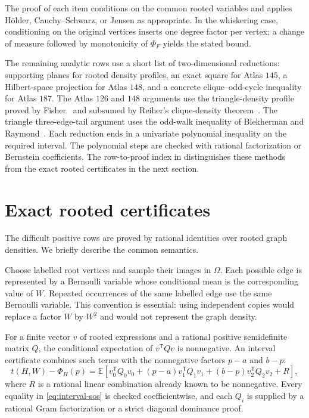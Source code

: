 \documentclass[11pt]{article}
\numberwithin{equation}{section}
\theoremstyle{definition}
\theoremstyle{remark}
\begin{document}
The proof of each item conditions on the common rooted variables and applies
H\"older, Cauchy--Schwarz, or Jensen as appropriate.  In the whiskering
case, conditioning on the original vertices inserts one degree factor per
vertex; a change of measure followed by monotonicity of $\Phi_F$ yields the
stated bound.

The remaining analytic rows use a short list of two-dimensional reductions:
supporting planes for rooted density profiles, an exact square for Atlas
$145$, a Hilbert-space projection for Atlas $148$, and a concrete
clique--odd-cycle inequality for Atlas $187$.  The Atlas $126$ and $148$
arguments use the triangle-density profile proved by Fisher~\cite{Fisher1989}
and subsumed by Reiher's clique-density theorem~\cite{Reiher2016}.  The
triangle three-edge-tail argument uses the odd-walk inequality of Blekherman
and Raymond~\cite{BlekhermanRaymond2023}.  Each reduction ends in a
univariate polynomial inequality on the required interval.  The polynomial
steps are checked with rational factorization or Bernstein coefficients.
The row-to-proof index in  distinguishes these methods
from the exact rooted certificates in the next section.

\section{Exact rooted certificates}

The difficult positive rows are proved by rational identities over rooted
graph densities.  We briefly describe the common semantics.

Choose labelled root vertices and sample their images in $\Omega$.  Each
possible edge is represented by a Bernoulli variable whose conditional mean
is the corresponding value of $W$.  Repeated occurrences of the same
labelled edge use the same Bernoulli variable.  This convention is essential:
using independent copies would replace a factor $W$ by $W^2$ and would not
represent the graph density.

For a finite vector $v$ of rooted expressions and a rational positive
semidefinite matrix $Q$, the conditional expectation of $v^{\mathsf T}Qv$
is nonnegative.  An interval certificate combines such terms with the
nonnegative factors $p-a$ and $b-p$:
\begin{equation}
 t(H,W)-\Phi_H(p)
 =\mathbb E\!\left[v_0^{\mathsf T}Q_0v_0
 +(p-a)v_1^{\mathsf T}Q_1v_1
 +(b-p)v_2^{\mathsf T}Q_2v_2+R\right],
 \label{eq:interval-sos}
\end{equation}
where $R$ is a rational linear combination already known to be nonnegative.
Every equality in \eqref{eq:interval-sos} is checked coefficientwise, and
each $Q_i$ is supplied by a rational Gram factorization or a strict diagonal
dominance proof.
\end{document}
